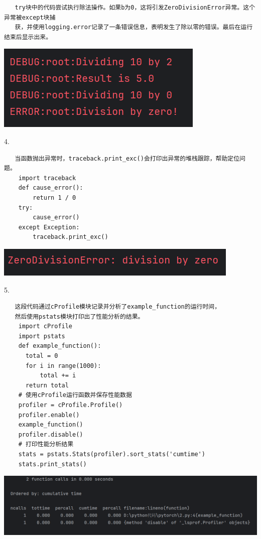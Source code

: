 \documentclass{article}
\begin{document}
 \begin{verbatim}
   try块中的代码尝试执行除法操作。如果b为0，这将引发ZeroDivisionError异常。这个异常被except块捕
   获，并使用logging.error记录了一条错误信息，表明发生了除以零的错误。最后在运行结束后显示出来。
 \end{verbatim}

\noindent
\begin{minipage}{\linewidth}
  \centering
  \includegraphics[width=0.5\linewidth]{学习3.png}
  \label{fig:example}
\end{minipage}

4.
\begin{verbatim}
   当函数抛出异常时，traceback.print_exc()会打印出异常的堆栈跟踪，帮助定位问题。
    import traceback
    def cause_error():
        return 1 / 0
    try:
        cause_error()
    except Exception:
        traceback.print_exc()
\end{verbatim}

\noindent
\begin{minipage}{\linewidth}
 \centering
  \includegraphics[width=0.5\linewidth]{学习4.png}
  \label{fig:example}
\end{minipage}



5.
\begin{verbatim}
   这段代码通过cProfile模块记录并分析了example_function的运行时间，
   然后使用pstats模块打印出了性能分析的结果。
    import cProfile
    import pstats
    def example_function():
      total = 0
      for i in range(1000):
          total += i
      return total
    # 使用cProfile运行函数并保存性能数据
    profiler = cProfile.Profile()
    profiler.enable()
    example_function()
    profiler.disable()
    # 打印性能分析结果
    stats = pstats.Stats(profiler).sort_stats('cumtime')
    stats.print_stats()     
\end{verbatim}


\noindent
\begin{minipage}{\linewidth}
 \centering
  \includegraphics[width=0.5\linewidth]{学习5.png}
  \label{fig:example}
\end{minipage}
\end{document}
